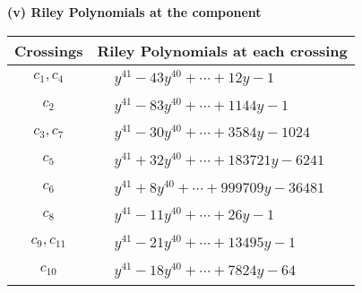 \documentclass[1p]{elsarticle_modified}
\theoremstyle{definition}
\begin{document}
\newpage\renewcommand{\arraystretch}{1}
\flushleft \textbf{(v) Riley Polynomials at the component}\newline \\
\begin{tabular}{m{50pt}|m{274pt}}
Crossings & \hspace{64pt}Riley Polynomials at each crossing \\
\hline $$\begin{aligned}c_{1},c_{4}\end{aligned}$$&$\begin{aligned}
&y^{41}-43 y^{40}+\cdots+12 y-1
\end{aligned}$\\
\hline $$\begin{aligned}c_{2}\end{aligned}$$&$\begin{aligned}
&y^{41}-83 y^{40}+\cdots+1144 y-1
\end{aligned}$\\
\hline $$\begin{aligned}c_{3},c_{7}\end{aligned}$$&$\begin{aligned}
&y^{41}-30 y^{40}+\cdots+3584 y-1024
\end{aligned}$\\
\hline $$\begin{aligned}c_{5}\end{aligned}$$&$\begin{aligned}
&y^{41}+32 y^{40}+\cdots+183721 y-6241
\end{aligned}$\\
\hline $$\begin{aligned}c_{6}\end{aligned}$$&$\begin{aligned}
&y^{41}+8 y^{40}+\cdots+999709 y-36481
\end{aligned}$\\
\hline $$\begin{aligned}c_{8}\end{aligned}$$&$\begin{aligned}
&y^{41}-11 y^{40}+\cdots+26 y-1
\end{aligned}$\\
\hline $$\begin{aligned}c_{9},c_{11}\end{aligned}$$&$\begin{aligned}
&y^{41}-21 y^{40}+\cdots+13495 y-1
\end{aligned}$\\
\hline $$\begin{aligned}c_{10}\end{aligned}$$&$\begin{aligned}
&y^{41}-18 y^{40}+\cdots+7824 y-64
\end{aligned}$\\
\hline
\end{tabular}\\~\\
\end{document}
